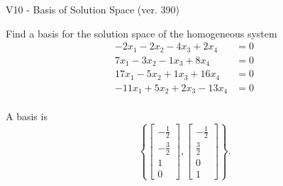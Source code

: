 \begin{exercise}
  \begin{exerciseTitle}V10 - Basis of Solution Space (ver. 390)\end{exerciseTitle}
  \begin{exerciseStatement}
    Find a basis for the solution space of the homogeneous system 
\begin{align*}
 -2 x_ 1 -2 x_ 2 -4 x_ 3 + 2 x_ 4 &= 0  \\ 
  7 x_ 1 -3 x_ 2 -1 x_ 3 + 8 x_ 4 &= 0  \\ 
  17 x_ 1 -5 x_ 2 + 1 x_ 3 + 16 x_ 4 &= 0  \\ 
  -11 x_ 1 + 5 x_ 2 + 2 x_ 3 -13 x_ 4 &= 0  \\ 
 \end{align*}


 
  \end{exerciseStatement}

  \begin{exerciseAnswer}
   A basis is   
\[\left\{\left[\begin{array}{c}
-\frac{1}{2} \\
-\frac{3}{2} \\
1 \\
0
\end{array}\right] , \left[\begin{array}{c}
-\frac{1}{2} \\
\frac{3}{2} \\
0 \\
1
\end{array}\right]\right\}.\]

  


  \end{exerciseAnswer}
\end{exercise}